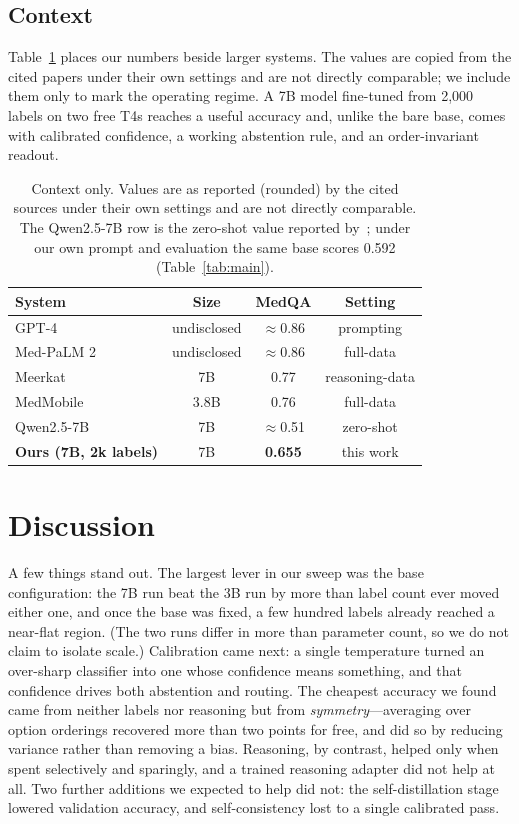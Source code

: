 \documentclass[conference]{IEEEtran}
\begin{document}
\subsection{Context}
Table~\ref{tab:context} places our numbers beside larger systems. The values are copied from the cited papers under their own settings and are not directly comparable; we include them only to mark the operating regime. A 7B model fine-tuned from 2{,}000 labels on two free T4s reaches a useful accuracy and, unlike the bare base, comes with calibrated confidence, a working abstention rule, and an order-invariant readout.

\begin{table}[tb]
\caption{Context only. Values are as reported (rounded) by the cited sources under their own settings and are not directly comparable. The Qwen2.5-7B row is the zero-shot value reported by~\cite{qwen}; under our own prompt and evaluation the same base scores 0.592 (Table~\ref{tab:main}).}
\label{tab:context}
\centering
\small
\setlength{\tabcolsep}{3pt}
\begin{tabular}{@{}lccc@{}}
\toprule
System & Size & MedQA & Setting \\
\midrule
GPT-4 \cite{gpt4med} & undisclosed & $\approx$0.86 & prompting \\
Med-PaLM 2 \cite{medpalm} & undisclosed & $\approx$0.86 & full-data \\
Meerkat \cite{meerkat} & 7B & 0.77 & reasoning-data \\
MedMobile \cite{medmobile} & 3.8B & 0.76 & full-data \\
Qwen2.5-7B \cite{qwen} & 7B & $\approx$0.51 & zero-shot \\
\textbf{Ours (7B, 2k labels)} & 7B & \textbf{0.655} & this work \\
\bottomrule
\end{tabular}
\end{table}

\section{Discussion}
A few things stand out. The largest lever in our sweep was the base configuration: the 7B run beat the 3B run by more than label count ever moved either one, and once the base was fixed, a few hundred labels already reached a near-flat region. (The two runs differ in more than parameter count, so we do not claim to isolate scale.) Calibration came next: a single temperature turned an over-sharp classifier into one whose confidence means something, and that confidence drives both abstention and routing. The cheapest accuracy we found came from neither labels nor reasoning but from \emph{symmetry}---averaging over option orderings recovered more than two points for free, and did so by reducing variance rather than removing a bias. Reasoning, by contrast, helped only when spent selectively and sparingly, and a trained reasoning adapter did not help at all. Two further additions we expected to help did not: the self-distillation stage lowered validation accuracy, and self-consistency lost to a single calibrated pass.
\end{document}
